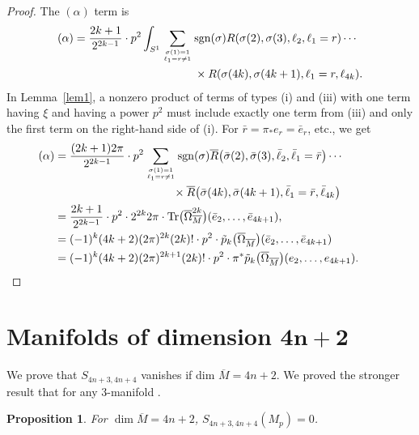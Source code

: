 \documentclass[pdftex]{sigma}
\numberwithin{equation}{section}
\newtheorem{Proposition}[Theorem]{Proposition}
\theoremstyle{definition}
\newcommand{\Tr}{{\rm Tr}}
\newcommand{\bo}{\overline\Omega}
\newcommand{\bom}{\bo_{\overline M}}
\newcommand{\bxi}{\xi}
\newcommand{\br}{ R}
\newcommand{\ocs}{\widetilde{{\rm CS}}}
\newcommand{\sgn}{{\rm sgn}}
\newcommand{\ints}{\int_{S^1}}
\newcommand{\om}{\overline{M}}
\newcommand{\omp}{M_p}
\begin{document}
\begin{proof}
The $(\alpha)$ term is
\begin{align*}
\begin{split}
(\alpha)= \frac{2k+1}{2^{2k-1}}\cdot p^2\ints \sum_{\sigma(1) = 1\atop \ell_1 = r\neq 1}{}& \sgn(\sigma)
\br(\sigma(2), \sigma(3), \ell_2, \ell_1 = r)\cdots\\
& \times
 \br(\sigma(4k),\sigma(4k+1), \ell_1 =r, \ell_{4k}).\nonumber
\end{split}
 \end{align*}
 In Lemma~\ref{lem1},
 a nonzero product of terms of types (i) and (iii)
 with one term having $\bxi$ and having a power $p^2$ must
include exactly one term from (iii) and only the first term on the right-hand side of (i).
For $\bar r = \pi_* e_r = \bar e_r$, etc., we get
 \begin{align*}(\alpha)
&= \frac{(2k+1)2\pi}{2^{2k-1}}\cdot p^2
 \sum_{\sigma(1) = 1\atop \ell_1 = r\neq 1} \sgn(\sigma)
\overline{R}\bigl(\bar\sigma(2), \bar\sigma(3), \bar\ell_2, \bar\ell_1 = \bar r\bigr)\cdots \\
&\hphantom{= \frac{(2k+1)2\pi}{2^{2k-1}}\cdot p^2
 \sum_{\sigma(1) = 1\atop \ell_1 = r\neq 1}}{}
\times
 \overline{R}\bigl(\bar\sigma(4k),\bar\sigma(4k+1), \bar\ell_1 =\bar r, \bar \ell_{4k}\bigr)\nonumber\\
 &= \frac{2k+1}{2^{2k-1}}\cdot p^2 \cdot 2^{2k}2\pi\cdot \Tr\bigl(\bom^{2k}\bigr)(\bar e_2,\dots, \bar e_{4k+1}),\\
 &= (-1)^k (4k+2)(2\pi)^{2k}(2k)!\cdot p^2 \cdot \tilde p_k\bigl(\bom\bigr)
 (\bar e_2,\dots, \bar e_{4k+1})\\
 &= (-1)^k (4k+2)(2\pi)^{2k+1}(2k)!\cdot
p^2 \cdot \pi^* \tilde p_k\bigl(\bom\bigr)
 (e_2,\dots, e_{4k+1}).\tag*{\qed}
 \end{align*}\renewcommand{\qed}{}
\end{proof}

\section[Manifolds of dimension 4n+2]{Manifolds of dimension $\boldsymbol{4n+2}$}\label{appb}

We prove that $S_{4n+3, 4n+4}$ vanishes if dim $\om = 4n+2$. We proved the stronger result that \smash{$\ocs{}^{\rm W}_{3} = 0$} for any $3$-manifold \cite[Proposition~2.7]{MRT4}.

\begin{Proposition} For $\dim\om = 4n+2$, $S_{4n+3,4n+4}(\omp) = 0$.
\end{Proposition}
\end{document}
